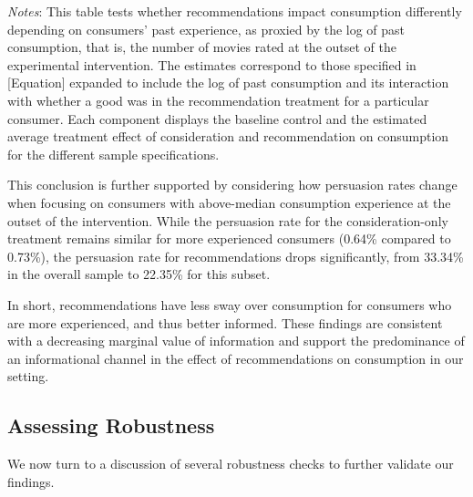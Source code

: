 \documentclass[12pt]{article}
\theoremstyle{newtheorem}
\begin{document}
\begin{table}[t]
	\centering
	
    \begin{minipage}{1\textwidth}
        \vspace*{.5em}
        \caption{Heterogeneous Effects of Recommendation by Consumption Experience}
        \label{table:reg-consumption-on-rec-hte-experience}
         \emph{Notes}:
        This table tests whether recommendations impact consumption differently depending on consumers' past experience, as proxied by the log of past consumption, that is, the number of movies rated at the outset of the experimental intervention.
        The estimates correspond to those specified in [Equation] expanded to include the log of past consumption and its interaction with whether a good was in the recommendation treatment for a particular consumer.
        Each component displays the baseline control and the estimated average treatment effect of consideration and recommendation on consumption for the different sample specifications. 
    \end{minipage}
\end{table}

This conclusion is further supported by considering how persuasion rates change when focusing on consumers with above-median consumption experience at the outset of the intervention. 
While the persuasion rate for the consideration-only treatment remains similar for more experienced consumers (0.64\% compared to 0.73\%), the persuasion rate for recommendations drops significantly, from 33.34\% in the overall sample to 22.35\% for this subset. 


In short, recommendations have less sway over consumption for consumers who are more experienced, and thus better informed.
These findings are consistent with a decreasing marginal value of information and support the predominance of an informational channel in the effect of recommendations on consumption in our setting.



\subsection{Assessing Robustness}
\label{section:robustness:robustness}

We now turn to a discussion of several robustness checks to further validate our findings.
\end{document}
